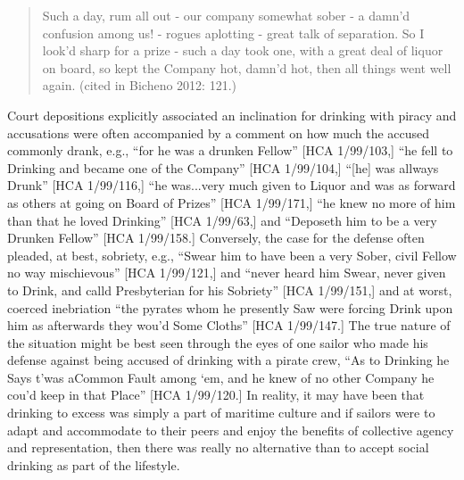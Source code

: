 \begin{quotation}
Such a day, rum all out - our company somewhat sober - a damn’d confusion among us! - rogues aplotting - great talk of separation. So I look’d sharp for a prize - such a day took one, with a great deal of liquor on board, so kept the Company hot, damn’d hot, then all things went well again. (cited in Bicheno 2012: 121.) 

\end{quotation}
\begin{styleStandard}
Court depositions explicitly associated an inclination for drinking with piracy and accusations were often accompanied by a comment on how much the accused commonly drank, e.g., “for he was a drunken Fellow” [HCA 1/99/103,] “he fell to Drinking and became one of the Company” [HCA 1/99/104,] “[he] was allways Drunk” [HCA 1/99/116,] “he was...very much given to Liquor and was as forward as others at going on Board of Prizes” [HCA 1/99/171,] “he knew no more of him than that he loved Drinking” [HCA 1/99/63,] and “Deposeth him to be a very Drunken Fellow” [HCA 1/99/158.] Conversely, the case for the defense often pleaded, at best, sobriety, e.g., “Swear him to have been a very Sober, civil Fellow no way mischievous” [HCA 1/99/121,] and “never heard him Swear, never given to Drink, and calld Presbyterian for his Sobriety” [HCA 1/99/151,] and at worst, coerced inebriation “the pyrates whom he presently Saw were forcing Drink upon him as afterwards they wou’d Some Cloths” [HCA 1/99/147.] The true nature of the situation might be best seen through the eyes of one sailor who made his defense against being accused of drinking with a pirate crew, “As to Drinking he Says t’was aCommon Fault among ‘em, and he knew of no other Company he cou’d keep in that Place” [HCA 1/99/120.] In reality, it may have been that drinking to excess was simply a part of maritime culture and if sailors were to adapt and accommodate to their peers and enjoy the benefits of collective agency and representation, then there was really no alternative than to accept social drinking as part of the lifestyle. \ 
\end{styleStandard}


